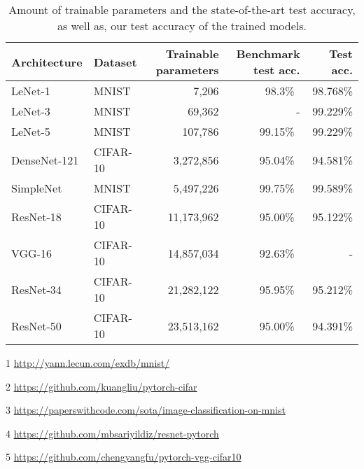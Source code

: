 

\begin{table}
\small

\begin{threeparttable}

    \caption{Amount of trainable parameters and the state-of-the-art test accuracy, as well as, our test accuracy of the trained models.}
    \label{tab:trainable_parameters}
    
    \centering
    \begin{tabular}{|l|l|r|r|r|}
        \hline
        \textbf{Architecture} & \textbf{Dataset} & \textbf{Trainable parameters} & \textbf{Benchmark test acc.} & \textbf{Test acc.} \\
        \hline
        LeNet-1 & MNIST & 7,206 & 98.3\% \tnote{1} \, & 98.768\% \\
        \hline
        LeNet-3 & MNIST & 69,362 & - & 99.229\% \\
        \hline
        LeNet-5 & MNIST & 107,786 & 99.15\% \tnote{1} \, & 99.229\% \\
        \hline
        DenseNet-121 & CIFAR-10 & 3,272,856 & 95.04\% \tnote{2} \, & 94.581\% \\
        \hline
        SimpleNet & MNIST & 5,497,226 & 99.75\% \tnote{3} \, & 99.589\% \\
        \hline
        ResNet-18 & CIFAR-10 & 11,173,962 & 95.00\% \tnote{4} \, & 95.122\% \\
        \hline
        VGG-16 & CIFAR-10 & 14,857,034 & 92.63\% \tnote{5} \, & - \\
        \hline
        ResNet-34 & CIFAR-10 & 21,282,122 & 95.95\% \tnote{4} \, & 95.212\% \\
        \hline
        ResNet-50 & CIFAR-10 & 23,513,162 & 95.00\% \tnote{4} \, & 94.391\% \\
        \hline
    \end{tabular}
    
\medskip %
\begin{tablenotes}
\footnotesize  %
\item[1] \label{note:lenet} \url{http://yann.lecun.com/exdb/mnist/}
\item[2] \url{https://github.com/kuangliu/pytorch-cifar}
\item[3] \url{https://paperswithcode.com/sota/image-classification-on-mnist}
\item[4] \url{https://github.com/mbsariyildiz/resnet-pytorch}
\item[5] \url{https://github.com/chengyangfu/pytorch-vgg-cifar10}


\end{tablenotes}
\end{threeparttable}
\end{table}
